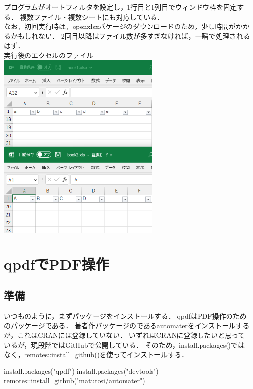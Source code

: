 \documentclass[
]{article}
\newenvironment{Shaded}{\begin{snugshade}}{\end{snugshade}}
\newcommand{\FunctionTok}[1]{\textcolor[rgb]{0.00,0.00,0.00}{#1}}
\newcommand{\NormalTok}[1]{#1}
\newcommand{\SpecialCharTok}[1]{\textcolor[rgb]{0.00,0.00,0.00}{#1}}
\newcommand{\StringTok}[1]{\textcolor[rgb]{0.31,0.60,0.02}{#1}}
\begin{document}
\begin{itemize}
  プログラムがオートフィルタを設定し，1行目と1列目でウィンドウ枠を固定する．
  複数ファイル・複数シートにも対応している．\\
  なお，初回実行時は，openxlsxパケージのダウンロードのため，少し時間がかかるかもしれない．
  2回目以降はファイル数が多すぎなければ，一瞬で処理されるはず．\\
  実行後のエクセルのファイル\\
  \includegraphics[width=0.6\textwidth,height=\textheight]{img/set_autofilter_freezepanel04.png}
\end{itemize}

\hypertarget{qpdf}{%
\section{qpdfでPDF操作}\label{qpdf}}

\hypertarget{ux6e96ux5099-14}{%
\subsection{準備}\label{ux6e96ux5099-14}}

いつものように，まずパッケージをインストールする．
qpdfはPDF操作のためのパッケージである．
著者作パッケージのであるautomaterをインストールするが，これはCRANには登録していない．
いずれはCRANに登録したいと思っているが，現段階ではGitHubで公開している．
そのため，install.packages()ではなく，remotes::install\_github()を使ってインストールする．

\begin{Shaded}
\begin{Highlighting}[]
\FunctionTok{install.packages}\NormalTok{(}\StringTok{"qpdf"}\NormalTok{)}
\FunctionTok{install.packages}\NormalTok{(}\StringTok{"devtools"}\NormalTok{)}
\NormalTok{remotes}\SpecialCharTok{::}\FunctionTok{install\_github}\NormalTok{(}\StringTok{"matutosi/automater"}\NormalTok{)}
\end{Highlighting}
\end{Shaded}
\end{document}
